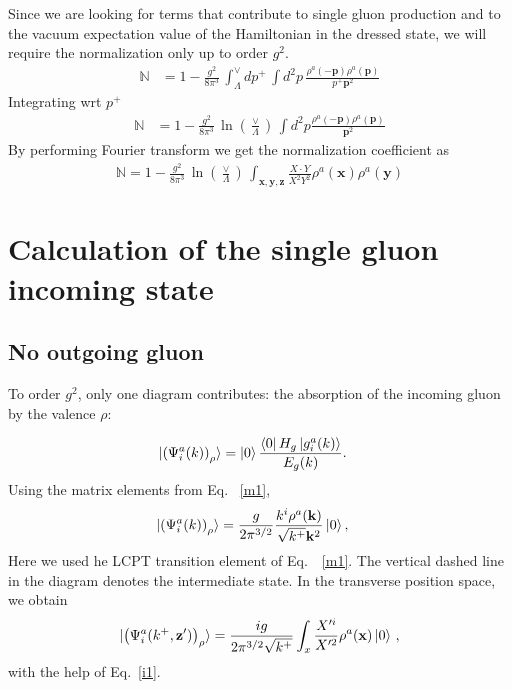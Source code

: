 \documentclass[aps,prd,amsmath,amssymb,nofootinbib]{revtex4-2}
\def\mf#1{\mathbb{#1}}
\def\v#1{\mathbf{#1}}
\numberwithin{equation}{section}
\begin{document}
Since we are looking for terms that contribute to single gluon production and to the vacuum expectation value of the Hamiltonian in the dressed state, we will require the normalization only up to order $g^{2}$.
\begin{align}\label{normmom}
    \mf{N} & = 1- \frac{g^2}{8 \pi^3 }\, \int_{\Lambda}^{\vee} dp^{+}\,
  \int d^2p\, \frac{\rho^a(-\v{p}) \rho^a(\v{p})}{p^{+}\v{p}^2}
\end{align}
Integrating wrt $p^{+}$
\begin{align}
\mf{N} & =  
 1 - \frac{g^2}{8 \pi^3 }\,\ln\left(\frac{\vee}{\Lambda}\right)\,
\int d^2p \frac{\rho^a(-\v{p}) \rho^a(\v{p})}{\v{p}^2}
\end{align}
By performing Fourier transform we get the normalization coefficient as
\begin{align}\label{normpos}
\mf{N} =  
 1 - \frac{g^2}{8 \pi^3 }\,\ln\left(\frac{\vee}{\Lambda}\right)\, 
  \int_{\v{x}, \v{y},\v{z}} \frac{X\cdot Y}{X^2 Y^2}   \rho^a(\v{x}) \rho^a(\v{y})
\end{align}
\section{Calculation of the single gluon incoming state}\label{sec:singleglue}
\subsection{No outgoing gluon}
To order $g^2$, only one diagram contributes: the absorption of the incoming gluon by the valence $\rho$: 
\begin{figure}[h]
\end{figure}
\begin{align}%
\ket{ \left(\Psi^{a}_{i}(k) \right)_{\rho} }   & =
   \ket{0}\frac{\bra{0}H_{g}\ket{g^a_{i}(k)}}{E_{g}(k)}.
\end{align}   
Using the matrix elements from Eq.~ \eqref{m1},
\begin{align}
  \ket{ \left(\Psi^{a}_{i}(k) \right)_{\rho} }   & =     \frac{g}{ 2\pi^{3/2}}\frac{k^i \rho^{a}(\v{k})}{\sqrt{k^+} \v{k}^{2}} \ket{0},
 \end{align}
Here we used he LCPT transition element of Eq.~~\eqref{m1}. The vertical dashed line in the diagram denotes the intermediate state. In the transverse position space, we obtain
\begin{equation}
  \ket{  \left(\Psi^{a}_{i}(k^+, \v{z}') \right)_{\rho} }  = \frac{ig}{2\pi^{3/2}\sqrt{ k^+}}\int_{x}\frac{X^{\prime i}}{X^{\prime 2}} \rho^{a}(\v{x})\ket{0}\,, 
\end{equation}
with the help of Eq.~\eqref{i1}. 
\end{document}

